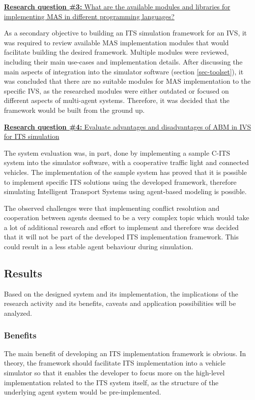 \documentclass[0main.tex]{subfiles}
\begin{document}
\ul{\textbf{Research question \#3:} What are the available modules and libraries for implementing MAS in different programming languages? }

As a secondary objective to building an ITS simulation framework for an IVS, it was required to review available MAS implementation 
modules that would facilitate building the desired framework. Multiple modules were reviewed, including their main use-cases 
and implementation details. After discussing the main aspects of integration into the simulator
software (section \ref{sec-toolset}), it was concluded that there are no suitable modules for MAS implementation to the
specific IVS, as the researched modules were either outdated or focused on different aspects
of multi-agent systems. Therefore, it was decided that the framework would be built from the
ground up.

\ul{\textbf{Research question \#4:} Evaluate advantages and disadvantages of ABM in IVS for ITS simulation}

The system evaluation was, in part, done by implementing a sample C-ITS system into the simulator software, with a cooperative 
traffic light and connected vehicles. The implementation of the sample system has proved that it is possible to implement specific 
ITS solutions using the developed framework, therefore simulating Intelligent Transport Systems using agent-based modeling is 
possible.

The observed challenges were that implementing conflict resolution and cooperation between agents deemed to be a very complex topic 
which would take a lot of additional research and effort to implement and therefore was decided that it will not be part of the 
developed ITS implementation framework. This could result in a less stable agent behaviour during simulation. 

\subsection{Results}

Based on the designed system and its implementation, the implications of the research activity and its benefits, caveats and application 
possibilities will be analyzed. 

\subsubsection{Benefits}

The main benefit of developing an ITS implementation framework is obvious. In theory,
the framework should facilitate ITS implementation into a vehicle simulator so that it enables
the developer to focus more on the high-level implementation related to the ITS system itself,
as the structure of the underlying agent system would be pre-implemented. 
\end{document}
